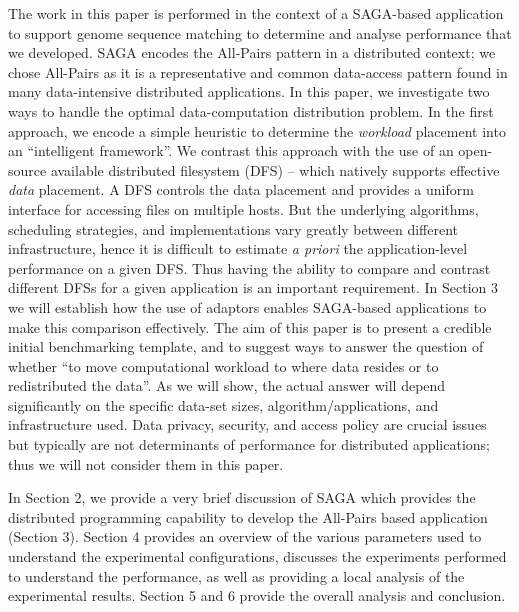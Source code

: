 \documentclass{rspublic}
\begin{document}
The work in this paper is performed in the context of a SAGA-based
application to support genome sequence matching to determine and
analyse performance that we developed. SAGA encodes the All-Pairs
pattern in a distributed context; we chose All-Pairs as it is a
representative and common data-access pattern found in many
data-intensive distributed applications.  In this paper, we
investigate two ways to handle the optimal data-computation
distribution problem.  In the first approach, we encode a simple
heuristic to determine the {\it workload} placement into an
``intelligent framework''. We contrast this approach with the use of
an open-source available distributed filesystem (DFS) -- which
natively supports effective {\it data} placement.  A DFS controls the
data placement and provides a uniform interface for accessing files on
multiple hosts. But the underlying algorithms, scheduling strategies,
and implementations vary greatly between different infrastructure,
hence it is difficult to estimate {\it a priori} the application-level
performance on a given DFS.  Thus having the ability to compare and
contrast different DFSs for a given application is an important
requirement. In Section 3 we will establish how the use of adaptors
enables SAGA-based applications to make this comparison effectively.
The aim of this paper is to present a credible initial benchmarking
template, and to suggest ways to answer the question of whether ``to
move computational workload to where data resides or to redistributed
the data''.  As we will show, the actual answer will depend
significantly on the specific data-set sizes, algorithm/applications,
and infrastructure used.  Data privacy, security, and access policy
are crucial issues but typically are not determinants of performance
for distributed applications; thus we will not consider them in this
paper.

In Section 2, we provide a very brief discussion of SAGA which
provides the distributed programming capability to develop the
All-Pairs based application (Section 3). Section 4 provides an
overview of the various parameters used to understand the experimental
configurations, discusses the experiments performed to understand the
performance, as well as providing a local analysis of the experimental
results. Section 5 and 6 provide the overall analysis and conclusion.

\end{document}
